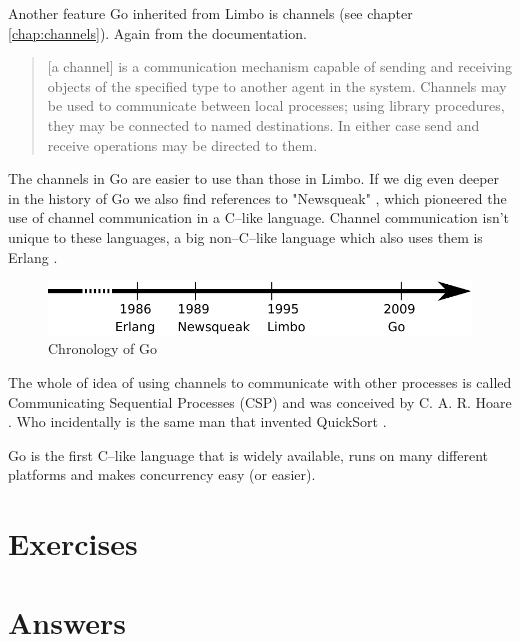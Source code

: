 Another feature Go inherited from Limbo is channels (see chapter
\ref{chap:channels}). Again from the documentation.
\begin{quote}
[a channel] is a communication mechanism capable of sending and receiving objects of
the specified type to another agent in the system. Channels may be used
to communicate between local processes; using library procedures, they
may be connected to named destinations. In either case send and receive
operations may be directed to them.
\end{quote}
The channels in Go are easier to use than those in Limbo.
If we dig even deeper in the history of Go we also find references
to "Newsqueak" \cite{newsqueak}, which pioneered the use of 
channel communication in a C--like language. Channel
communication isn't unique to these languages, a big non--C--like
language which also uses them is Erlang \cite{erlang}.

\begin{figure}[H]
\caption{Chronology of Go}
\label{fig:chrono-of-go}
\begin{center}
\includegraphics[scale=0.65]{fig/go-history.pdf}
\end{center}
\end{figure}

The whole of idea of using channels to communicate with other processes
is called Communicating Sequential Processes (CSP) and was conceived
by C. A. R. Hoare \cite{hoare}. Who incidentally is the same man that
invented QuickSort \cite{Quicksort}.

\begin{lbar}
Go is the first C--like language that is widely available,
runs on many
different platforms and makes concurrency easy (or easier).
\end{lbar}

\section{Exercises}


\cleardoublepage
\section{Answers}
\shipoutAnswer
